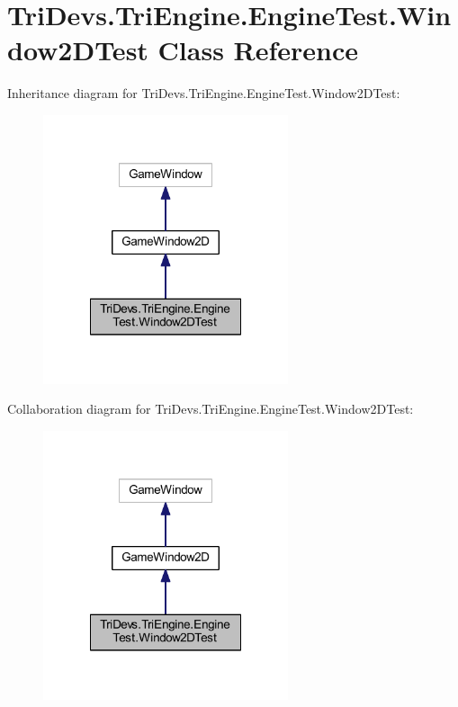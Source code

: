\hypertarget{class_tri_devs_1_1_tri_engine_1_1_engine_test_1_1_window2_d_test}{\section{Tri\-Devs.\-Tri\-Engine.\-Engine\-Test.\-Window2\-D\-Test Class Reference}
\label{class_tri_devs_1_1_tri_engine_1_1_engine_test_1_1_window2_d_test}
}


Inheritance diagram for Tri\-Devs.\-Tri\-Engine.\-Engine\-Test.\-Window2\-D\-Test\-:
\nopagebreak
\begin{figure}[H]
\begin{center}
\leavevmode
\includegraphics[width=204pt]{class_tri_devs_1_1_tri_engine_1_1_engine_test_1_1_window2_d_test__inherit__graph}
\end{center}
\end{figure}


Collaboration diagram for Tri\-Devs.\-Tri\-Engine.\-Engine\-Test.\-Window2\-D\-Test\-:
\nopagebreak
\begin{figure}[H]
\begin{center}
\leavevmode
\includegraphics[width=204pt]{class_tri_devs_1_1_tri_engine_1_1_engine_test_1_1_window2_d_test__coll__graph}
\end{center}
\end{figure}
